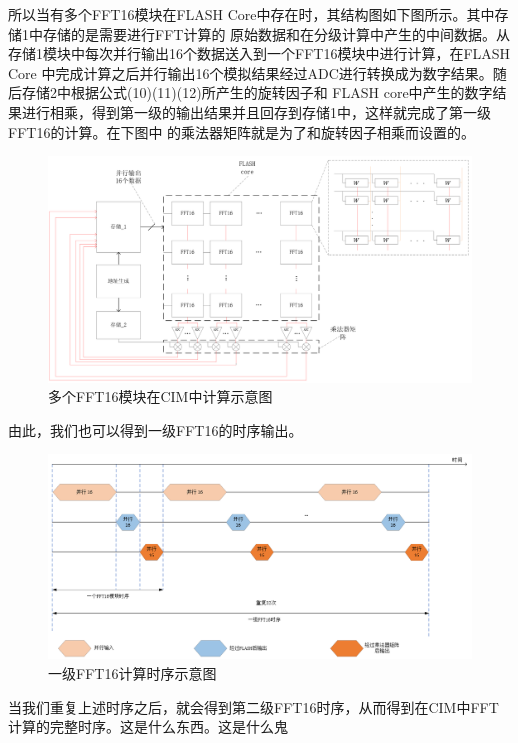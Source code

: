 \documentclass[12pt,a4paper]{article}
\begin{document}
\noindent 所以当有多个FFT16模块在FLASH Core中存在时，其结构图如下图所示。其中存储1中存储的是需要进行FFT计算的
原始数据和在分级计算中产生的中间数据。从存储1模块中每次并行输出16个数据送入到一个FFT16模块中进行计算，在FLASH Core
中完成计算之后并行输出16个模拟结果经过ADC进行转换成为数字结果。随后存储2中根据公式(10)(11)(12)所产生的旋转因子和
FLASH core中产生的数字结果进行相乘，得到第一级的输出结果并且回存到存储1中，这样就完成了第一级FFT16的计算。在下图中
的乘法器矩阵就是为了和旋转因子相乘而设置的。
\begin{figure}[h]
\centering
\includegraphics[scale=0.45]{figures/figure5}
\caption{多个FFT16模块在CIM中计算示意图}
\end{figure}

由此，我们也可以得到一级FFT16的时序输出。
\begin{figure}[h]
\centering
\includegraphics[scale=0.6]{figures/figure6}
\caption{一级FFT16计算时序示意图}
\end{figure}
\noindent 当我们重复上述时序之后，就会得到第二级FFT16时序，从而得到在CIM中FFT计算的完整时序。这是什么东西。这是什么鬼
\end{document}

